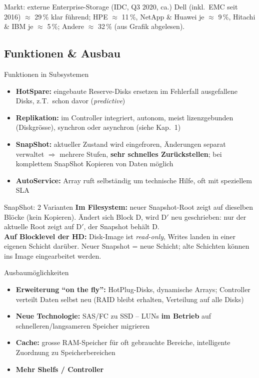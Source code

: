 \documentclass[a4paper, fontsize=7pt]{scrartcl}
\begin{document}
\begin{subbox}{Markt: externe Enterprise-Storage (IDC, Q3 2020, ca.)}
Dell (inkl.\ EMC seit 2016) $\approx$ 29\,\% klar führend; HPE $\approx$ 11\,\%,
NetApp \& Huawei je $\approx$ 9\,\%, Hitachi \& IBM je $\approx$ 5\,\%;
Andere $\approx$ 32\,\% (aus Grafik abgelesen).
\end{subbox}

\subsection{Funktionen \& Ausbau}

\begin{mainbox}{Funktionen in Subsystemen}
\begin{itemize}
    \item \textbf{HotSpare:} eingebaute Reserve-Disks ersetzen im Fehlerfall
          ausgefallene Disks, z.T.\ schon davor (\emph{predictive})
    \item \textbf{Replikation:} im Controller integriert, autonom, meist
          lizenzgebunden (Diskgrösse), synchron oder asynchron (siehe Kap.\ 1)
    \item \textbf{SnapShot:} aktueller Zustand wird eingefroren, Änderungen
          separat verwaltet $\Rightarrow$ mehrere Stufen, \textbf{sehr schnelles
          Zurückstellen}; bei komplettem SnapShot Kopieren von Daten möglich
    \item \textbf{AutoService:} Array ruft selbständig um technische Hilfe,
          oft mit speziellem SLA
\end{itemize}
\end{mainbox}

\begin{subbox}{SnapShot: 2 Varianten}
\textbf{Im Filesystem:} neuer Snapshot-Root zeigt auf dieselben Blöcke (kein
Kopieren). Ändert sich Block D, wird D$'$ neu geschrieben: nur der aktuelle Root
zeigt auf D$'$, der Snapshot behält D.\\
\textbf{Auf Blocklevel der HD:} Disk-Image ist \emph{read-only}, Writes landen in
einer eigenen Schicht darüber. Neuer Snapshot = neue Schicht; alte Schichten
können ins Image eingearbeitet werden.
\end{subbox}

\begin{mainbox}{Ausbaumöglichkeiten}
\begin{itemize}
    \item \textbf{Erweiterung ``on the fly'':} HotPlug-Disks, dynamische Arrays;
          Controller verteilt Daten selbst neu (RAID bleibt erhalten, Verteilung
          auf alle Disks)
    \item \textbf{Neue Technologie:} SAS/FC zu SSD -- LUNs \textbf{im Betrieb}
          auf schnelleren/langsameren Speicher migrieren
    \item \textbf{Cache:} grosse RAM-Speicher für oft gebrauchte Bereiche,
          intelligente Zuordnung zu Speicherbereichen
    \item \textbf{Mehr Shelfs / Controller}
\end{itemize}
\end{mainbox}
\end{document}
